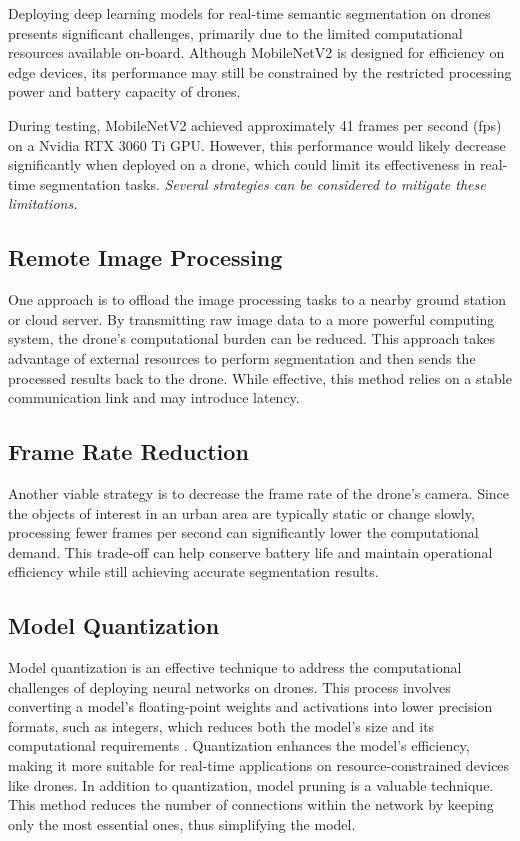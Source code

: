 \documentclass[a4paper]{article}
\begin{document}
Deploying deep learning models for real-time semantic segmentation on drones presents significant challenges, primarily due to the limited computational resources available on-board. Although MobileNetV2 is designed for efficiency on edge devices, its performance may still be constrained by the restricted processing power and battery capacity of drones.

During testing, MobileNetV2 achieved approximately 41 frames per second (fps) on a Nvidia RTX 3060 Ti GPU. However, this performance would likely decrease significantly when deployed on a drone, which could limit its effectiveness in real-time segmentation tasks. \textit{Several strategies can be considered to mitigate these limitations.}

\subsection{Remote Image Processing}

One approach is to offload the image processing tasks to a nearby ground station or cloud server. By transmitting raw image data to a more powerful computing system, the drone’s computational burden can be reduced. This approach takes advantage of external resources to perform segmentation and then sends the processed results back to the drone. While effective, this method relies on a stable communication link and may introduce latency.

\subsection{Frame Rate Reduction}

Another viable strategy is to decrease the frame rate of the drone’s camera. Since the objects of interest in an urban area are typically static or change slowly, processing fewer frames per second can significantly lower the computational demand. This trade-off can help conserve battery life and maintain operational efficiency while still achieving accurate segmentation results.

\subsection{Model Quantization}

Model quantization is an effective technique to address the computational challenges of deploying neural networks on drones. This process involves converting a model’s floating-point weights and activations into lower precision formats, such as integers, which reduces both the model’s size and its computational requirements \cite{han2016}. Quantization enhances the model’s efficiency, making it more suitable for real-time applications on resource-constrained devices like drones. In addition to quantization, model pruning is a valuable technique. This method reduces the number of connections within the network by keeping only the most essential ones, thus simplifying the model.
\end{document}
